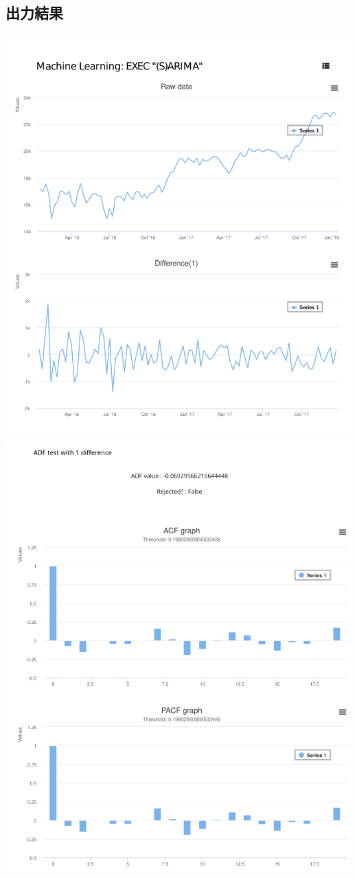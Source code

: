 \documentclass{scrartcl}
\begin{document}
\subsection{出力結果}
\label{sec:orgd215215}
\includegraphics [width=16cm] {./rect4145.png}
\newpage
\includegraphics [width=16cm] {./rect1607.png}
\end{document}
